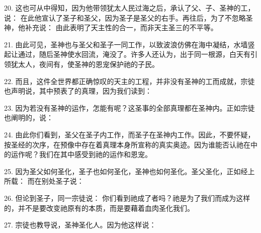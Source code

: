 20. 这也可从中得知，因为他带领犹太人民过海之后，承认了父、子、圣神的工，说： 在此他宣认了圣子和圣父，因为圣子是圣父的右手。再往后，为了不忽略圣神，他补充说： 由此表明了天主性的合一，而非天主圣三的不平等。\par

21. 由此可见，圣神也与圣父和圣子一同工作，以致波浪仿佛在海中凝结，水墙竖起让通过，随后圣神使水回流，淹没了。许多人还认为，出于同一根源，白天有引领犹太人，夜间有，使圣神的恩宠保护祂的子民。\par

22. 而且，这件全世界都正确惊叹的天主的工程，并非没有圣神的工而成就，宗徒也声明说，其中预表了的真理，因为我们读到：\par

23. 因为若没有圣神的运作，怎能有呢？这圣事的全部真理都在圣神内。正如宗徒也阐明的，说：\par

24. 由此你们看到，圣父在圣子内工作，而圣子在圣神内工作。因此，不要怀疑，按圣经的次序，在预像中存在着真理本身所宣称的真实奥迹。因为谁能否认祂在中的运作呢？我们在其中感受到祂的运作和恩宠。\par

25. 因为圣父如何圣化，圣子也如何圣化，圣神也如何圣化。圣父圣化，正如经上所载： 而在别处圣子说：\par

26. 但论到圣子，同一宗徒说： 你们看到祂成了者吗？祂是为了我们而成为这样的，并不是要改变祂原有的本质，而是要藉着血肉圣化我们。\par

27. 宗徒也教导说，圣神圣化人。因为他这样说：\par

